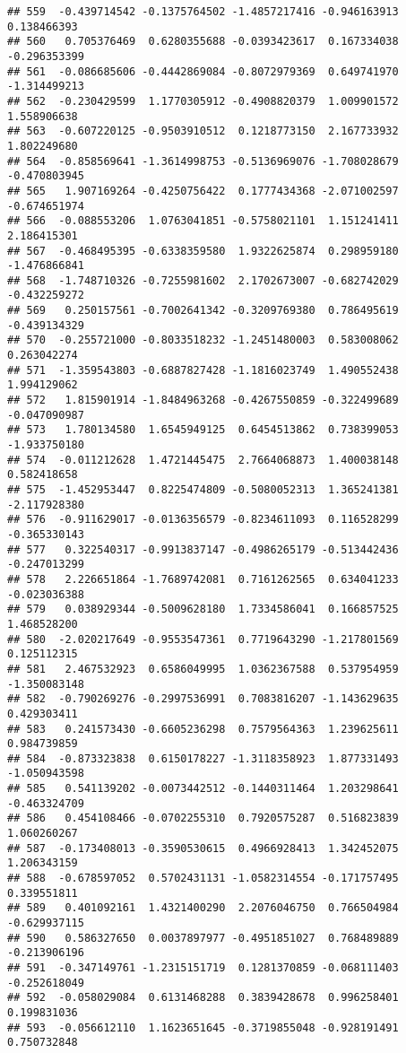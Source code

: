 \documentclass[
]{article}
\begin{document}
\begin{verbatim}
## 559  -0.439714542 -0.1375764502 -1.4857217416 -0.946163913  0.138466393
## 560   0.705376469  0.6280355688 -0.0393423617  0.167334038 -0.296353399
## 561  -0.086685606 -0.4442869084 -0.8072979369  0.649741970 -1.314499213
## 562  -0.230429599  1.1770305912 -0.4908820379  1.009901572  1.558906638
## 563  -0.607220125 -0.9503910512  0.1218773150  2.167733932  1.802249680
## 564  -0.858569641 -1.3614998753 -0.5136969076 -1.708028679 -0.470803945
## 565   1.907169264 -0.4250756422  0.1777434368 -2.071002597 -0.674651974
## 566  -0.088553206  1.0763041851 -0.5758021101  1.151241411  2.186415301
## 567  -0.468495395 -0.6338359580  1.9322625874  0.298959180 -1.476866841
## 568  -1.748710326 -0.7255981602  2.1702673007 -0.682742029 -0.432259272
## 569   0.250157561 -0.7002641342 -0.3209769380  0.786495619 -0.439134329
## 570  -0.255721000 -0.8033518232 -1.2451480003  0.583008062  0.263042274
## 571  -1.359543803 -0.6887827428 -1.1816023749  1.490552438  1.994129062
## 572   1.815901914 -1.8484963268 -0.4267550859 -0.322499689 -0.047090987
## 573   1.780134580  1.6545949125  0.6454513862  0.738399053 -1.933750180
## 574  -0.011212628  1.4721445475  2.7664068873  1.400038148  0.582418658
## 575  -1.452953447  0.8225474809 -0.5080052313  1.365241381 -2.117928380
## 576  -0.911629017 -0.0136356579 -0.8234611093  0.116528299 -0.365330143
## 577   0.322540317 -0.9913837147 -0.4986265179 -0.513442436 -0.247013299
## 578   2.226651864 -1.7689742081  0.7161262565  0.634041233 -0.023036388
## 579   0.038929344 -0.5009628180  1.7334586041  0.166857525  1.468528200
## 580  -2.020217649 -0.9553547361  0.7719643290 -1.217801569  0.125112315
## 581   2.467532923  0.6586049995  1.0362367588  0.537954959 -1.350083148
## 582  -0.790269276 -0.2997536991  0.7083816207 -1.143629635  0.429303411
## 583   0.241573430 -0.6605236298  0.7579564363  1.239625611  0.984739859
## 584  -0.873323838  0.6150178227 -1.3118358923  1.877331493 -1.050943598
## 585   0.541139202 -0.0073442512 -0.1440311464  1.203298641 -0.463324709
## 586   0.454108466 -0.0702255310  0.7920575287  0.516823839  1.060260267
## 587  -0.173408013 -0.3590530615  0.4966928413  1.342452075  1.206343159
## 588  -0.678597052  0.5702431131 -1.0582314554 -0.171757495  0.339551811
## 589   0.401092161  1.4321400290  2.2076046750  0.766504984 -0.629937115
## 590   0.586327650  0.0037897977 -0.4951851027  0.768489889 -0.213906196
## 591  -0.347149761 -1.2315151719  0.1281370859 -0.068111403 -0.252618049
## 592  -0.058029084  0.6131468288  0.3839428678  0.996258401  0.199831036
## 593  -0.056612110  1.1623651645 -0.3719855048 -0.928191491  0.750732848

\end{verbatim}
\end{document}
